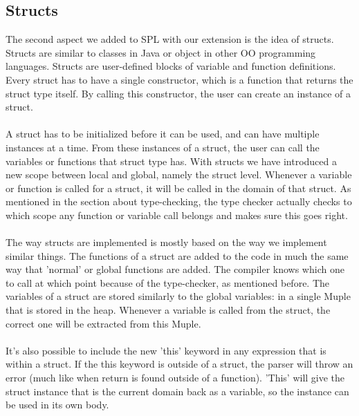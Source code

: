 \documentclass[10pt,a4paper]{article}
\begin{document}
\subsection{Structs}
The second aspect we added to SPL with our extension is the idea of structs. Structs are similar to classes in Java or object in other OO programming languages. Structs are user-defined blocks of variable and function definitions. Every struct has to have a single constructor, which is a function that returns the struct type itself. By calling this constructor, the user can create an instance of a struct.\\
\\
A struct has to be initialized before it can be used, and can have multiple instances at a time. From these instances of a struct, the user can call the variables or functions that struct type has. With structs we have introduced a new scope between local and global, namely the struct level. Whenever a variable or function is called for a struct, it will be called in the domain of that struct. As mentioned in the section about type-checking, the type checker actually checks to which scope any function or variable call belongs and makes sure this goes right.\\
\\
The way structs are implemented is mostly based on the way we implement similar things. The functions of a struct are added to the code in much the same way that 'normal' or global functions are added. The compiler knows which one to call at which point because of the type-checker, as mentioned before. The variables of a struct are stored similarly to the global variables: in a single Muple that is stored in the heap. Whenever a variable is called from the struct, the correct one will be extracted from this Muple.\\
\\
It's also possible to include the new 'this' keyword in any expression that is within a struct. If the this keyword is outside of a struct, the parser will throw an error (much like when return is found outside of a function). 'This' will give the struct instance that is the current domain back as a variable, so the instance can be used in its own body.

\appendix
\end{document}

